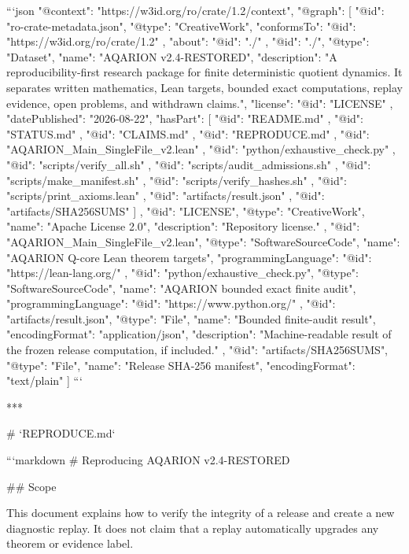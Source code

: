 ```json
{
  "@context": "https://w3id.org/ro/crate/1.2/context",
  "@graph": [
    {
      "@id": "ro-crate-metadata.json",
      "@type": "CreativeWork",
      "conformsTo": {
        "@id": "https://w3id.org/ro/crate/1.2"
      },
      "about": {
        "@id": "./"
      }
    },
    {
      "@id": "./",
      "@type": "Dataset",
      "name": "AQARION v2.4-RESTORED",
      "description": "A reproducibility-first research package for finite deterministic quotient dynamics. It separates written mathematics, Lean targets, bounded exact computations, replay evidence, open problems, and withdrawn claims.",
      "license": {
        "@id": "LICENSE"
      },
      "datePublished": "2026-08-22",
      "hasPart": [
        { "@id": "README.md" },
        { "@id": "STATUS.md" },
        { "@id": "CLAIMS.md" },
        { "@id": "REPRODUCE.md" },
        { "@id": "AQARION_Main_SingleFile_v2.lean" },
        { "@id": "python/exhaustive_check.py" },
        { "@id": "scripts/verify_all.sh" },
        { "@id": "scripts/audit_admissions.sh" },
        { "@id": "scripts/make_manifest.sh" },
        { "@id": "scripts/verify_hashes.sh" },
        { "@id": "scripts/print_axioms.lean" },
        { "@id": "artifacts/result.json" },
        { "@id": "artifacts/SHA256SUMS" }
      ]
    },
    {
      "@id": "LICENSE",
      "@type": "CreativeWork",
      "name": "Apache License 2.0",
      "description": "Repository license."
    },
    {
      "@id": "AQARION_Main_SingleFile_v2.lean",
      "@type": "SoftwareSourceCode",
      "name": "AQARION Q-core Lean theorem targets",
      "programmingLanguage": {
        "@id": "https://lean-lang.org/"
      }
    },
    {
      "@id": "python/exhaustive_check.py",
      "@type": "SoftwareSourceCode",
      "name": "AQARION bounded exact finite audit",
      "programmingLanguage": {
        "@id": "https://www.python.org/"
      }
    },
    {
      "@id": "artifacts/result.json",
      "@type": "File",
      "name": "Bounded finite-audit result",
      "encodingFormat": "application/json",
      "description": "Machine-readable result of the frozen release computation, if included."
    },
    {
      "@id": "artifacts/SHA256SUMS",
      "@type": "File",
      "name": "Release SHA-256 manifest",
      "encodingFormat": "text/plain"
    }
  ]
}
```

***

# `REPRODUCE.md`

```markdown
# Reproducing AQARION v2.4-RESTORED

## Scope

This document explains how to verify the integrity of a release and create a
new diagnostic replay. It does not claim that a replay automatically upgrades
any theorem or evidence label.

